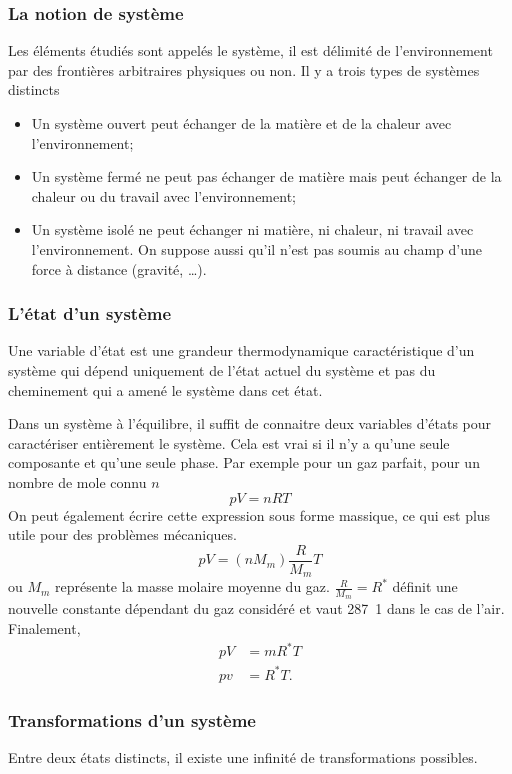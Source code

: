 \subsubsection{La notion de système}
Les éléments étudiés sont appelés le système,
il est délimité de l'environnement par des
frontières arbitraires physiques ou non.
Il y a trois types de systèmes distincts
\begin{itemize}
  \item Un système ouvert peut échanger de la matière et
    de la chaleur avec l'environnement;
  \item Un système fermé ne peut pas échanger de matière
    mais peut échanger de la chaleur ou du travail avec l'environnement;
  \item Un système isolé ne peut échanger ni matière,
    ni chaleur, ni travail avec l'environnement.
    On suppose aussi qu'il n'est pas soumis au champ
    d'une force à distance (gravité, \ldots).
\end{itemize}

\subsubsection{L'état d'un système}
Une variable d'état est une grandeur thermodynamique caractéristique
d'un système qui dépend uniquement de l'état actuel du système et
pas du cheminement qui a amené le système dans cet état.

Dans un système à l'équilibre, il suffit de connaitre deux variables d'états
pour caractériser entièrement le système.
Cela est vrai si il n'y a qu'une seule composante et qu'une seule phase.
Par exemple pour un gaz parfait, pour un nombre de mole connu $n$
\[ pV = nRT \]
On peut également écrire cette expression sous forme massique,
ce qui est plus utile pour des problèmes mécaniques.
\[ pV = (nM_m) \frac R {M_m} T \]
ou $M_m$ représente la masse molaire moyenne du gaz.
$\frac{R}{M_m} = R^*$ définit une nouvelle constante dépendant du gaz considéré
et vaut \si{287.1}{\joule\per\kilogram\kelvin} dans le cas de l'air.
Finalement,
\begin{align*}
  pV & = mR^*T\\
  pv & = R^*T.
\end{align*}

\subsubsection{Transformations d'un système}
Entre deux états distincts,
il existe une infinité de transformations possibles.

